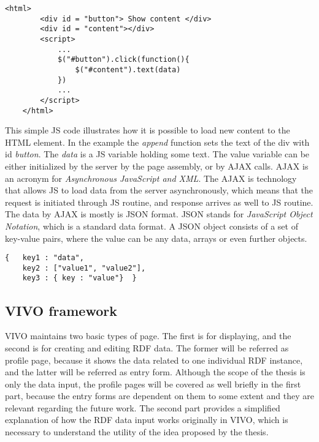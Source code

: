 \begin{lstlisting}[captionpos=b, caption=JavaScript routine assigned to an HTML element, label=jsListing, belowskip=1em, aboveskip=2em,
basicstyle=\footnotesize,frame=single]
	<html>
		<div id = "button"> Show content </div>
		<div id = "content"></div>
		<script>
			...
			$("#button").click(function(){
				$("#content").text(data)
			})
			...	
		</script>
	</html>
\end{lstlisting}

This simple JS code illustrates how it is possible to load new content to the HTML element. In the example the \textit{append} function sets the text of the div with id \textit{button}. The \textit{data} is a JS variable holding
some text. The value variable can be either initialized by the server by the page assembly, or by AJAX calls. AJAX is an acronym for \textit{Asynchronous JavaScript and XML}. The AJAX is technology that allows JS to load data from the server asynchronously, which means that the request is initiated through JS routine, and response arrives as well to JS routine. The data by AJAX is mostly is JSON format. JSON stands for \textit{JavaScript Object Notation}, which is a standard data format. A JSON object consists of a set of key-value pairs, where the value can be any data, arrays or even further objects.

\begin{lstlisting}[captionpos=b, caption=JSON object example, label=jsListing, belowskip=1em, aboveskip=2em,
basicstyle=\footnotesize,frame=single]
{	key1 : "data",
	key2 : ["value1", "value2"],
	key3 : { key : "value"}  }
\end{lstlisting}


\subsection{VIVO framework} \label{vivo}

VIVO maintains two basic types of page. The first is for displaying, and the second is for creating and editing RDF data. The former will be referred as profile page, because it shows the data related to one individual RDF instance, and the latter will be referred as entry form. Although the scope of the thesis is only the data input, the profile pages will be covered as well briefly in the first part, because the entry forms are dependent on them to some extent and they are relevant regarding the future work. The second part provides a simplified explanation of how the RDF data input works originally in VIVO, which is necessary to understand the utility of the idea proposed by the thesis.

